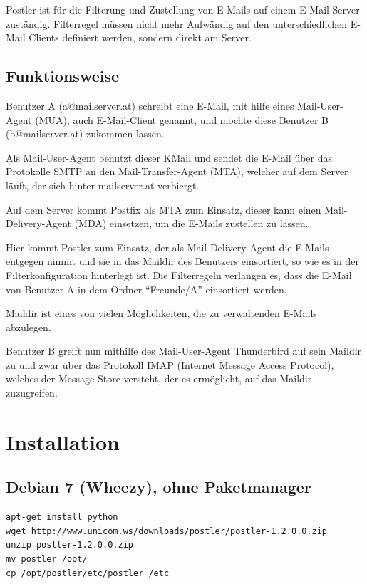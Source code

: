\documentclass[a4paper,10pt]{article}
\begin{document}
Postler ist für die Filterung und Zustellung von E-Mails auf einem E-Mail Server zuständig. Filterregel müssen nicht mehr Aufwändig auf den unterschiedlichen E-Mail Clients definiert werden, sondern direkt am Server.

\subsection{Funktionsweise}

Benutzer A (a@mailserver.at) schreibt eine E-Mail, mit hilfe eines Mail-User-Agent (MUA), auch E-Mail-Client genannt, und möchte diese Benutzer B (b@mailserver.at) zukommen lassen.

Als Mail-User-Agent benutzt dieser KMail und sendet die E-Mail über das Protokolle SMTP an den Mail-Transfer-Agent (MTA), welcher auf dem Server läuft, der sich hinter mailserver.at verbiergt.

Auf dem Server kommt Postfix als MTA zum Einsatz, dieser kann einen Mail-Delivery-Agent (MDA) einsetzen, um die E-Mails zustellen zu lassen.

Hier kommt Postler zum Einsatz, der als Mail-Delivery-Agent die E-Mails entgegen nimmt und sie in das Maildir des Benutzers einsortiert, so wie es in der Filterkonfiguration hinterlegt ist. Die Filterregeln verlangen es, dass die E-Mail von Benutzer A in dem Ordner ``Freunde/A'' einsortiert werden.

Maildir ist eines von vielen Möglichkeiten, die zu verwaltenden E-Mails abzulegen.

Benutzer B greift nun mithilfe des Mail-User-Agent Thunderbird auf sein Maildir zu und zwar über das Protokoll IMAP (Internet Message Access Protocol), welches der Message Store versteht, der es ermöglicht, auf das Maildir zuzugreifen.

\newpage

\section{Installation}

\subsection{Debian 7 (Wheezy), ohne Paketmanager}

\begin{lstlisting}[style=bash,caption={Installation unter Debian 7 (Wheezy)}]
apt-get install python
wget http://www.unicom.ws/downloads/postler/postler-1.2.0.0.zip
unzip postler-1.2.0.0.zip
mv postler /opt/
cp /opt/postler/etc/postler /etc
\end{lstlisting}
\end{document}
